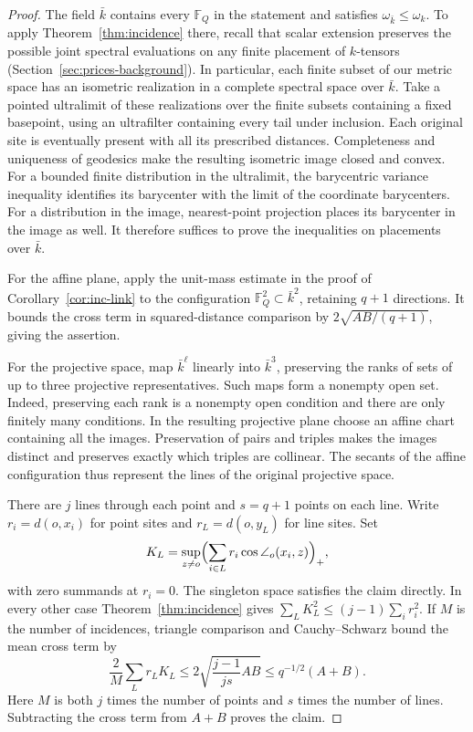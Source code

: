 \begin{proof}
The field $\bar k$ contains every $\mathbb F_Q$ in the statement
and satisfies $\omega_{\bar k}\le\omega_k$. To apply
Theorem~\ref{thm:incidence} there, recall that scalar extension
preserves the possible joint spectral evaluations on any finite
placement of $k$-tensors (Section~\ref{sec:prices-background}).
In particular, each finite subset of our metric space has an isometric
realization in a complete spectral space over $\bar k$. Take a pointed
ultralimit of these realizations over the finite subsets containing a
fixed basepoint, using an ultrafilter containing every tail under inclusion.
Each original site is eventually present with all its prescribed
distances. Completeness and uniqueness of geodesics make the resulting
isometric image closed and convex. For a bounded finite distribution
in the ultralimit, the barycentric variance inequality identifies its
barycenter with the limit of the coordinate barycenters. For a
distribution in the image, nearest-point projection places its
barycenter in the image as well. It therefore suffices to prove the
inequalities on placements over $\bar k$.

For the affine plane, apply the unit-mass estimate in the proof of
Corollary~\ref{cor:inc-link} to the configuration $\mathbb F_Q^2\subset\bar k^2$, retaining $q+1$
directions. It bounds the cross term in squared-distance comparison
by $2\sqrt{AB/(q+1)}$, giving the assertion.

For the projective space, map $\bar k^\ell$ linearly into $\bar k^3$,
preserving the ranks of sets of up to three projective
representatives. Such maps form a nonempty open set. Indeed, preserving
each rank is a nonempty open condition and there are only finitely many
conditions. In the resulting projective plane choose an affine chart
containing all the images. Preservation of pairs and triples makes the
images distinct and preserves exactly which triples are collinear.
The secants of the affine configuration thus represent the lines of
the original projective space.

There are $j$ lines through each point and $s=q+1$ points on each line.
Write $r_i=d(o,x_i)$ for point sites and $r_L=d(o,y_L)$ for line sites.
Set
\[
 K_L=\sup_{z\ne o}\Bigl(\sum_{i\in L}
       r_i\cos\angle_o(x_i,z)\Bigr)_+ ,
\]
with zero summands at $r_i=0$. The singleton space satisfies the
claim directly. In every other case Theorem~\ref{thm:incidence}
gives $\sum_L K_L^2\le (j-1)\sum_i r_i^2$. If $M$ is the number of
incidences, triangle comparison and Cauchy--Schwarz bound the mean
cross term by
\[
 \frac{2}{M}\sum_L r_L K_L
 \le 2\sqrt{\frac{j-1}{js}AB}
 \le q^{-1/2}(A+B).
\]
Here $M$ is both $j$ times the number of points and $s$ times the
number of lines. Subtracting the cross term from $A+B$ proves the claim.
\end{proof}

